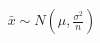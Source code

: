 \documentclass[preview]{standalone}
\begin{document}
\begin{align*}
\bar{x} \sim N ( \mu , \frac{\sigma^2}{n} )
\end{align*}
\end{document}
